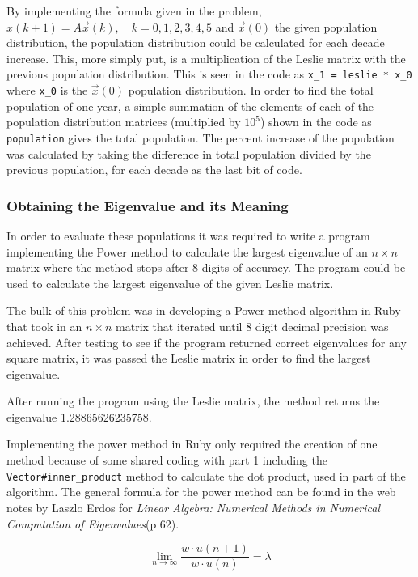 \documentclass[letterpaper,12pt]{article}
\begin{document}
\vspace{11pt}

By implementing the formula given in the problem,
$x(k + 1) = A\vec{x}(k), \quad k = 0,1,2,3,4,5$ and $\vec{x}(0)$ the given
population distribution, the population distribution could be calculated for
each decade increase.
This, more simply put, is a multiplication of the Leslie matrix with the
previous population distribution. This is seen in the code as
\texttt{x\_1 = leslie * x\_0} where \texttt{x\_0} is the $\vec{x}(0)$ population
distribution.
In order to find the total population of one year, a simple summation of the
elements of each of the population distribution matrices (multiplied by $10^5$)
shown in the code as \texttt{population} gives the total population.
The percent increase of the population was calculated by taking the difference
in total population divided by the previous population,
for each decade as the last bit of code. 

\subsubsection{Obtaining the Eigenvalue and its Meaning}

In order to evaluate these populations it was required to write a program
implementing the Power method to calculate the largest eigenvalue of an
$n \times n$ matrix where the method stops after 8 digits of accuracy.
The program could be used to calculate the largest eigenvalue of the given
Leslie matrix.

The bulk of this problem was in developing a Power method algorithm in Ruby that
took in an $n \times n$ matrix that iterated until 8 digit decimal precision was
achieved.
After testing to see if the program returned correct eigenvalues for any square
matrix, it was passed the Leslie matrix in order to find the largest eigenvalue.

After running the program using the Leslie matrix, the method returns the
eigenvalue 1.28865626235758.

Implementing the power method in Ruby only required the creation of one method
because of some shared coding with part 1 including the
\texttt{Vector\#inner\_product} method to calculate the dot product,
used in part of the algorithm.
The general formula for the power method can be found in the web notes by Laszlo Erdos
for \textit{Linear Algebra: Numerical Methods in Numerical Computation of Eigenvalues}(p 62).


\[\lim_{n\to\infty} \frac{{w} \cdot {u(n+1)}}{ {w} \cdot {u(n)}} =\lambda\]
\end{document}

